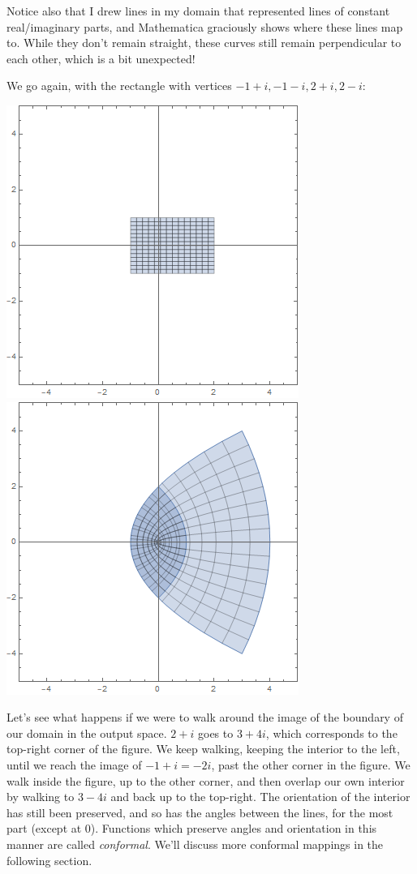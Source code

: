 Notice also that I drew lines in my domain that represented lines of constant real/imaginary parts, and Mathematica graciously shows where these lines map to. While they don't remain straight, these curves still remain perpendicular to each other, which is a bit unexpected!

We go again, with the rectangle with vertices $-1+i, -1-i, 2+i, 2-i$:
\begin{center}
    \includegraphics[scale=0.5]{images/domzsqr1.png}
    \includegraphics[scale=0.5]{images/ranzsqr1.png}
\end{center}
Let's see what happens if we were to walk around the image of the boundary of our domain in the output space. $2+i$ goes to $3+4i$, which corresponds to the top-right corner of the figure. We keep walking, keeping the interior to the left, until we reach the image of $-1+i = -2i$, past the other corner in the figure. We walk inside the figure, up to the other corner, and then overlap our own interior by walking to $3-4i$ and back up to the top-right. The orientation of the interior has still been preserved, and so has the angles between the lines, for the most part (except at 0). Functions which preserve angles and orientation in this manner are called \textit{conformal}. We'll discuss more conformal mappings in the following section.

